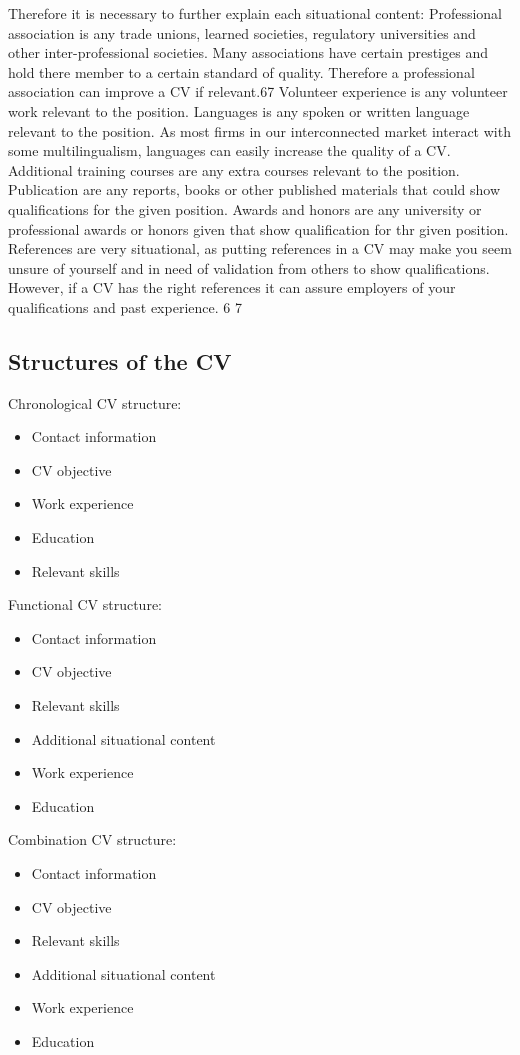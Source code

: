 Therefore it is necessary to further explain each situational content:
Professional association is any trade unions, learned societies, regulatory universities and other inter-professional societies.
Many associations have certain prestiges and hold there member to a certain standard of quality.
Therefore a professional association can improve a CV if relevant.67
Volunteer experience is any volunteer work relevant to the position.
Languages is any spoken or written language relevant to the position.
As most firms in our interconnected market interact with some multilingualism, languages can easily increase the quality of a CV.
Additional training courses are any extra courses relevant to the position.
Publication are any reports, books or other published materials that could show qualifications for the given position.
Awards and honors are any university or professional awards or honors given that show qualification for thr given position.
References are very situational, as putting references in a CV may make you seem unsure of yourself and in need of validation from others to show qualifications.
However, if a CV has the right references it can assure employers of your qualifications and past experience.
6%
7%


\subsection{Structures of the CV}
Chronological CV structure:
\begin{itemize}
   \item  Contact information
   \item  CV objective
   \item  Work experience
   \item  Education
   \item  Relevant skills
   \end{itemize}


Functional CV structure:
\begin{itemize}
   \item  Contact information
   \item  CV objective
   \item  Relevant skills
   \item  Additional situational content
   \item  Work experience
   \item  Education
   \end{itemize}

Combination CV structure:
\begin{itemize}
   \item  Contact information
   \item  CV objective
   \item  Relevant skills
   \item  Additional situational content
   \item  Work experience
   \item  Education
   \end{itemize}